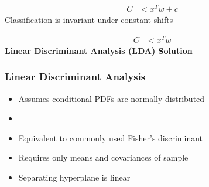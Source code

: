 \begin{frame}
\begin{overlayarea}{\textwidth}{0.4\textheight}
         {
    \begin{align*}
         C &< x^T w + c
    \end{align*}
         Classification is invariant under constant shifts
    }
                 
         {
         \begin{align*}
      C &< x^T w
         \end{align*}
    \textbf{Linear Discriminant Analysis (LDA) Solution}
         }
        \end{overlayarea}

\end{frame}


\begin{frame}
    \frametitle{Linear Discriminant Analysis}
    \begin{center}
		\begin{itemize}
            \item Assumes conditional PDFs are normally distributed
            \item {} 
            \item Equivalent to commonly used Fisher's discriminant
            \item Requires only means and covariances of sample
            \item Separating hyperplane is linear
		\end{itemize}
    \end{center}
\end{frame}

